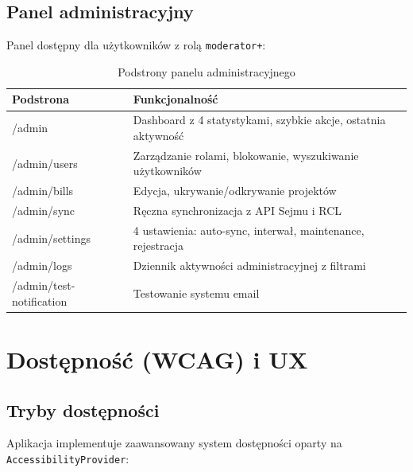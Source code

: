 \documentclass[12pt,a4paper]{article}
\begin{document}
\subsection{Panel administracyjny}

Panel dostępny dla użytkowników z rolą \texttt{moderator+}:

\begin{table}[H]
\centering
\renewcommand{\arraystretch}{1.3}
\begin{tabularx}{\textwidth}{l X}
\toprule
\textbf{Podstrona} & \textbf{Funkcjonalność} \\
\midrule
/admin & Dashboard z 4 statystykami, szybkie akcje, ostatnia aktywność \\
/admin/users & Zarządzanie rolami, blokowanie, wyszukiwanie użytkowników \\
/admin/bills & Edycja, ukrywanie/odkrywanie projektów \\
/admin/sync & Ręczna synchronizacja z API Sejmu i RCL \\
/admin/settings & 4 ustawienia: auto-sync, interwał, maintenance, rejestracja \\
/admin/logs & Dziennik aktywności administracyjnej z filtrami \\
/admin/test-notification & Testowanie systemu email \\
\bottomrule
\end{tabularx}
\caption{Podstrony panelu administracyjnego}
\end{table}

\newpage

\section{Dostępność (WCAG) i UX}

\subsection{Tryby dostępności}

Aplikacja implementuje zaawansowany system dostępności oparty na \texttt{AccessibilityProvider}:
\end{document}

